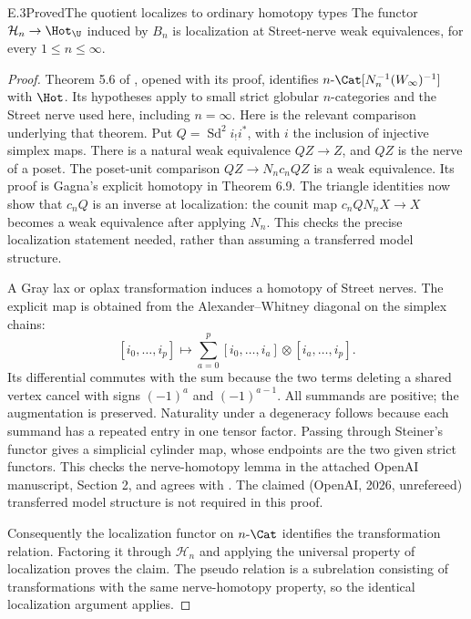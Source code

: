 \begin{claim}{E.3}{Proved}{The quotient localizes to ordinary homotopy types}
The functor $\mathcal H_n\to\Hot_\U$ induced by $B_n$ is localization at Street-nerve weak equivalences, for every $1\leq n\leq\infty$.
\end{claim}
\begin{proof}
Theorem 5.6 of \citet{Gagna2018}, opened with its proof, identifies $n\text{-}\Cat[N_n^{-1}(W_\infty)^{-1}]$ with $\Hot$. Its hypotheses apply to small strict globular $n$-categories and the Street nerve used here, including $n=\infty$. Here is the relevant comparison underlying that theorem. Put $Q=\operatorname{Sd}^2 i_!i^*$, with $i$ the inclusion of injective simplex maps. There is a natural weak equivalence $QZ\to Z$, and $QZ$ is the nerve of a poset. The poset-unit comparison $QZ\to N_nc_nQZ$ is a weak equivalence. Its proof is Gagna's explicit homotopy in Theorem 6.9. The triangle identities now show that $c_nQ$ is an inverse at localization: the counit map $c_nQN_nX\to X$ becomes a weak equivalence after applying $N_n$. This checks the precise localization statement needed, rather than assuming a transferred model structure.

A Gray lax or oplax transformation induces a homotopy of Street nerves. The explicit map is obtained from the Alexander--Whitney diagonal on the simplex chains:
\[
 [i_0,\ldots,i_p]\longmapsto
 \sum_{a=0}^p[i_0,\ldots,i_a]\otimes[i_a,\ldots,i_p].
\]
Its differential commutes with the sum because the two terms deleting a shared vertex cancel with signs $(-1)^a$ and $(-1)^{a-1}$. All summands are positive; the augmentation is preserved. Naturality under a degeneracy follows because each summand has a repeated entry in one tensor factor. Passing through Steiner's functor gives a simplicial cylinder map, whose endpoints are the two given strict functors. This checks the nerve-homotopy lemma in the attached OpenAI manuscript, Section 2, and agrees with \citet[\S3.3 and Proposition 3.4]{AraTheoremB}. The claimed (OpenAI, 2026, unrefereed) transferred model structure is not required in this proof.

Consequently the localization functor on $n\text{-}\Cat$ identifies the transformation relation. Factoring it through $\mathcal H_n$ and applying the universal property of localization proves the claim. The pseudo relation is a subrelation consisting of transformations with the same nerve-homotopy property, so the identical localization argument applies.
\end{proof}

